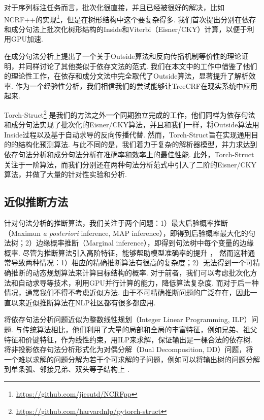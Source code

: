 对于序列标注任务而言，批次化很直接，并且已经被很好的解决，比如NCRF++的实现\footnote{\url{https://github.com/jiesutd/NCRFpp}}，但是在树形结构中这个要复杂得多.
我们首次提出分别在依存和成分句法上批次化树形结构的Inside和Viterbi（Eisner/CKY）计算，以便于利用GPU加速.

\citet{eisner-2016-inside}在成分句法分析上提出了一个关于Outside算法和反向传播机制等价性的理论证明，并同样讨论了其他类似于依存文法的范式.
我们在本文中的工作中借鉴了他们的理论性工作，在依存和成分文法中完全取代了Outside算法，显著提升了解析效率.
作为一个经验性分析，我们相信我们的尝试能够让TreeCRF在现实系统中应用起来.

Torch-Struct\footnote{\url{https://github.com/harvardnlp/pytorch-struct}} \citep{rush-2020-torch}是我们的方法之外一个同期独立完成的工作，他们同样为依存句法和成分句法实现了批次化的Eisner/CKY算法，并且和我们一样，将Outside算法用Inside过程以及基于自动求导的反向传播代替.
然而，Torch-Struct旨在实现通用目的的结构化预测算法.
与此不同的是，我们着力于复杂的解析器模型，并力求达到依存句法分析和成分句法分析在准确率和效率上的最佳性能.
此外，Torch-Struct关注于一阶算法，而我们分别还在两种句法分析范式中引入了二阶的Eisner/CKY算法，并做了大量的针对性实验和分析.

\subsection{近似推断方法}
针对句法分析的推断算法，我们关注于两个问题：1）最大后验概率推断（Maximun \textit{a posteriori} inference, MAP inference），即得到后验概率最大化的句法树；2）边缘概率推断（Marginal inference），即得到句法树中每个变量的边缘概率.
尽管为推断算法引入高阶特征，能够帮助模型准确率的提升 \citep{mcdonald-pereira-2006-online,carreras-2007-experiments,koo-collins-2010-efficient,ma-zhao-2012-fourth}，
然而这种通常导致两种情况：1）相应的精确推断算法有很高的复杂度；2）无法得到一个可精确推断的动态规划算法来计算目标结构的概率.
对于前者，我们可以考虑批次化方法和自动求导等技术，利用GPU并行计算的能力，降低算法复杂度.
而对于后一种情况，通常我们不得不考虑近似方法.
由于不可精确推断问题的广泛存在，因此一直以来近似推断算法在NLP社区都有很多都应用.

\citet{martins-etal-2009-concise}将依存句法分析问题近似为整数线性规划（Integer Linear Programming, ILP）问题.
与传统算法相比，他们利用了大量的局部和全局的丰富特征，例如兄弟、祖父特征和价键特征，作为线性约束，用ILP来求解，保证输出是一棵合法的依存树.
\citet{koo-etal-2010-dual}将非投影依存句法分析形式化为对偶分解（Dual Decomposition, DD）问题，将一个难以求解的问题分解为若干个可求解的子问题，例如可以将输出树的问题分解到单条弧、邻接兄弟、双头等子结构上 \citep{martins-etal-2011-dual}.

